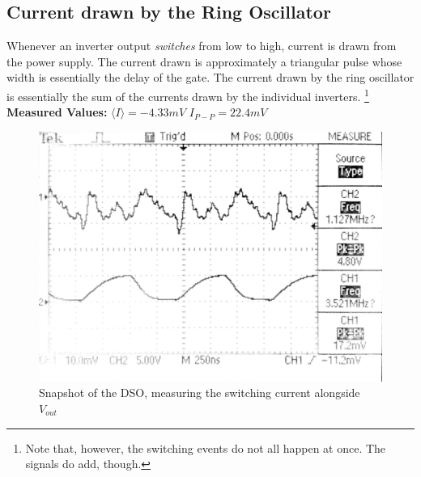 \documentclass[a4paper, 11pt]{article}
\begin{document}
\subsection{Current drawn by the Ring Oscillator}
Whenever an inverter output \emph{switches} from low to high, current is drawn from the power supply. The current drawn is approximately a triangular pulse whose width is essentially the delay of the gate. The current drawn by the ring oscillator is essentially the sum of the currents drawn by the individual inverters. \footnote{Note that, however, the switching events do not all happen at once. The signals do add, though.}\\
{\bf Measured Values:} \hspace{2em} $\langle I\rangle = -4.33mV $ \hspace{2em} $I_{P-P} = 22.4mV$
\begin{figure}[H]
\centering
\includegraphics[scale=0.1]{EE214_8.jpg}
\caption{Snapshot of the DSO, measuring the switching current alongside $V_{out}$}
\end{figure}
\end{document}
